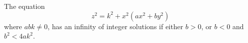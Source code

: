 \begin{proposition}
    The equation
\[
    z^2=k^2+x^2(ax^2+by^2)
\]
    where $abk\ne0$, has an infinity of integer solutions if either $b>0$, or $b<0$ and $b^2<4ak^2$.
\end{proposition}
